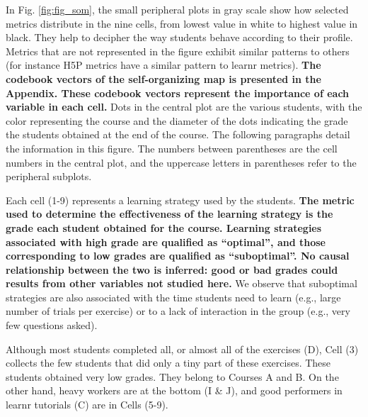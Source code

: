 \documentclass{aims}
\theoremstyle{definition}
\begin{document}
In Fig. \ref {fig:fig_som}, the small peripheral plots in gray scale
show how selected metrics distribute in the nine cells, from lowest
value in white to highest value in black. They help to decipher the way
students behave according to their profile. Metrics that are not
represented in the figure exhibit similar patterns to others (for
instance H5P metrics have a similar pattern to learnr metrics).
\textbf{The codebook vectors of the self-organizing map is presented in
the Appendix. These codebook vectors represent the importance of each
variable in each cell.} Dots in the central plot are the various
students, with the color representing the course and the diameter of the
dots indicating the grade the students obtained at the end of the
course. The following paragraphs detail the information in this figure.
The numbers between parentheses are the cell numbers in the central
plot, and the uppercase letters in parentheses refer to the peripheral
subplots.

Each cell (1-9) represents a learning strategy used by the students.
\textbf{The metric used to determine the effectiveness of the learning
strategy is the grade each student obtained for the course. Learning
strategies associated with high grade are qualified as ``optimal'', and
those corresponding to low grades are qualified as ``suboptimal''. No
causal relationship between the two is inferred: good or bad grades
could results from other variables not studied here.} We observe that
suboptimal strategies are also associated with the time students need to
learn (e.g., large number of trials per exercise) or to a lack of
interaction in the group (e.g., very few questions asked).

Although most students completed all, or almost all of the exercises
(D), Cell (3) collects the few students that did only a tiny part of
these exercises. These students obtained very low grades. They belong to
Courses A and B. On the other hand, heavy workers are at the bottom (I
\& J), and good performers in learnr tutorials (C) are in Cells (5-9).
\end{document}
